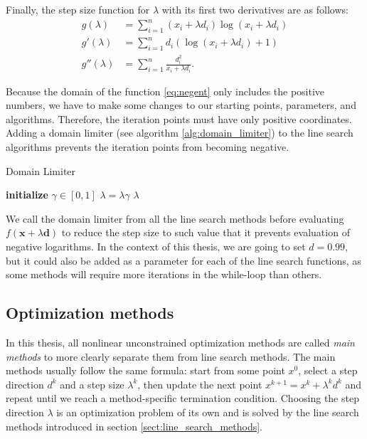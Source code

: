 \documentclass[english, 12pt, a4paper, sci, utf8, a-1b, online, table]{aaltothesis}
\newcommand{\vect}[1]{\ensuremath{\mathbf{#1}}}
\begin{document}
Finally, the step size function for $\lambda$ with its first two derivatives are as follows:
\begin{align}
    g(\lambda) &= \sum_{i=1}^{n} (x_i + \lambda d_i) \log (x_i + \lambda d_i) \\
    g'(\lambda) &= \sum_{i=1}^{n} d_i (\log(x_i + \lambda d_i) + 1) \\
    g''(\lambda) &= \sum_{i=1}^{n} \frac{d_i^2}{x_i + \lambda d_i}.
\end{align}

Because the domain of the function \eqref{eq:negent} only includes the positive numbers, we have to make some changes to our starting points, parameters, and algorithms. Therefore, the iteration points must have only positive coordinates. Adding a domain limiter (see algorithm \ref{alg:domain_limiter}) to the line search algorithms prevents the iteration points from becoming negative.

\begin{algorithm}[H]
\caption{Domain Limiter}
\label{alg:domain_limiter}
\begin{algorithmic}[1]
\STATE \textbf{initialize} $\gamma \in [0, 1]$
\WHILE{min $(\vect{x} + \lambda \vect{d}) \leq 0$}
    \STATE $\lambda = \lambda \gamma$
\ENDWHILE
\RETURN $\lambda$
\end{algorithmic}
\end{algorithm}

We call the domain limiter from all the line search methods before evaluating $f(\vect{x} + \lambda\vect{d})$ to reduce the step size to such value that it prevents evaluation of negative logarithms. In the context of this thesis, we are going to set $d = 0.99$, but it could also be added as a parameter for each of the line search functions, as some methods will require more iterations in the while-loop than others.


\subsection{Optimization methods}


In this thesis, all nonlinear unconstrained optimization methods are called \emph{main methods} to more clearly separate them from line search methods. The main methods usually follow the same formula: start from some point $x^0$, select a step direction $d^k$ and a step size $\lambda^k$, then update the next point $x^{k + 1} = x^k + \lambda^k d^k$ and repeat until we reach a method-specific termination condition. Choosing the step direction $\lambda$ is an optimization problem of its own and is solved by the line search methods introduced in section \ref{sect:line_search_methods}. \cite{book:nonlinear_programming}
\end{document}
